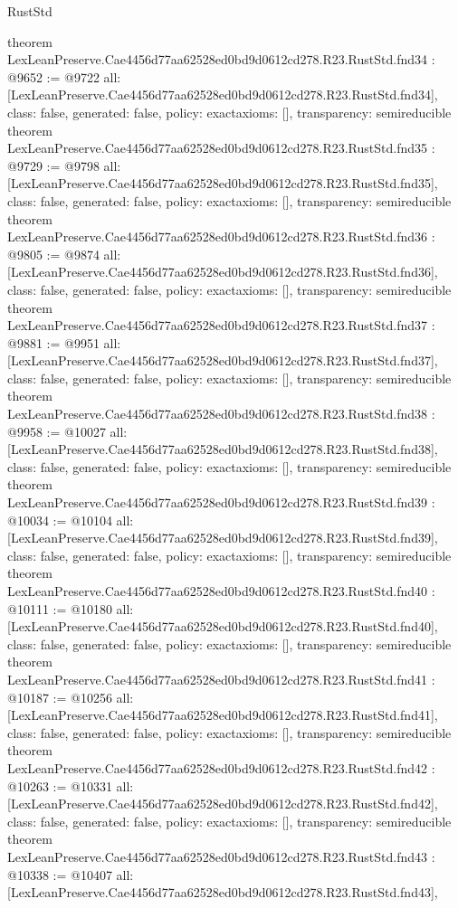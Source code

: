 \begin{lexlean}{RustStd}
\begin{coremodule}
{}
theorem LexLeanPreserve.Cae4456d77aa62528ed0bd9d0612cd278.R23.RustStd.fnd34 : @9652 := @9722 {
  all: [LexLeanPreserve.Cae4456d77aa62528ed0bd9d0612cd278.R23.RustStd.fnd34],
  class: false,
  generated: false,
  policy: exact{axioms: []},
  transparency: semireducible
}
theorem LexLeanPreserve.Cae4456d77aa62528ed0bd9d0612cd278.R23.RustStd.fnd35 : @9729 := @9798 {
  all: [LexLeanPreserve.Cae4456d77aa62528ed0bd9d0612cd278.R23.RustStd.fnd35],
  class: false,
  generated: false,
  policy: exact{axioms: []},
  transparency: semireducible
}
theorem LexLeanPreserve.Cae4456d77aa62528ed0bd9d0612cd278.R23.RustStd.fnd36 : @9805 := @9874 {
  all: [LexLeanPreserve.Cae4456d77aa62528ed0bd9d0612cd278.R23.RustStd.fnd36],
  class: false,
  generated: false,
  policy: exact{axioms: []},
  transparency: semireducible
}
theorem LexLeanPreserve.Cae4456d77aa62528ed0bd9d0612cd278.R23.RustStd.fnd37 : @9881 := @9951 {
  all: [LexLeanPreserve.Cae4456d77aa62528ed0bd9d0612cd278.R23.RustStd.fnd37],
  class: false,
  generated: false,
  policy: exact{axioms: []},
  transparency: semireducible
}
theorem LexLeanPreserve.Cae4456d77aa62528ed0bd9d0612cd278.R23.RustStd.fnd38 : @9958 := @10027 {
  all: [LexLeanPreserve.Cae4456d77aa62528ed0bd9d0612cd278.R23.RustStd.fnd38],
  class: false,
  generated: false,
  policy: exact{axioms: []},
  transparency: semireducible
}
theorem LexLeanPreserve.Cae4456d77aa62528ed0bd9d0612cd278.R23.RustStd.fnd39 : @10034 := @10104 {
  all: [LexLeanPreserve.Cae4456d77aa62528ed0bd9d0612cd278.R23.RustStd.fnd39],
  class: false,
  generated: false,
  policy: exact{axioms: []},
  transparency: semireducible
}
theorem LexLeanPreserve.Cae4456d77aa62528ed0bd9d0612cd278.R23.RustStd.fnd40 : @10111 := @10180 {
  all: [LexLeanPreserve.Cae4456d77aa62528ed0bd9d0612cd278.R23.RustStd.fnd40],
  class: false,
  generated: false,
  policy: exact{axioms: []},
  transparency: semireducible
}
theorem LexLeanPreserve.Cae4456d77aa62528ed0bd9d0612cd278.R23.RustStd.fnd41 : @10187 := @10256 {
  all: [LexLeanPreserve.Cae4456d77aa62528ed0bd9d0612cd278.R23.RustStd.fnd41],
  class: false,
  generated: false,
  policy: exact{axioms: []},
  transparency: semireducible
}
theorem LexLeanPreserve.Cae4456d77aa62528ed0bd9d0612cd278.R23.RustStd.fnd42 : @10263 := @10331 {
  all: [LexLeanPreserve.Cae4456d77aa62528ed0bd9d0612cd278.R23.RustStd.fnd42],
  class: false,
  generated: false,
  policy: exact{axioms: []},
  transparency: semireducible
}
theorem LexLeanPreserve.Cae4456d77aa62528ed0bd9d0612cd278.R23.RustStd.fnd43 : @10338 := @10407 {
  all: [LexLeanPreserve.Cae4456d77aa62528ed0bd9d0612cd278.R23.RustStd.fnd43],
}
\end{coremodule}
\end{lexlean}
